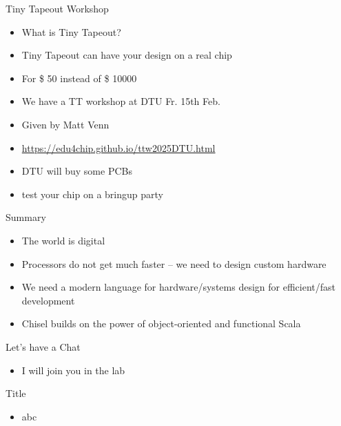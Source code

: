 \begin{frame}[fragile]{Tiny Tapeout Workshop}
\begin{itemize}
\item What is Tiny Tapeout?
\item Tiny Tapeout can have your design on a real chip
\item For \$ 50 instead of \$ 10000
\item We have a TT workshop at DTU Fr. 15th Feb.
\item Given by Matt Venn
\item \url{https://edu4chip.github.io/ttw2025DTU.html}
\item DTU will buy some PCBs
\item test your chip on a bringup party
\end{itemize}
\end{frame}

\begin{frame}[fragile]{Summary}
\begin{itemize}
\item The world is digital
\item Processors do not get much faster -- we need to design custom hardware
\item We need a modern language for hardware/systems design for efficient/fast development
\item Chisel builds on the power of object-oriented and functional Scala
\end{itemize}
\end{frame}

\begin{frame}[fragile]{Let's have a Chat}
\begin{itemize}
\item I will join you in the lab
\end{itemize}
\end{frame}



\begin{frame}[fragile]{Title}
\begin{itemize}
\item abc
\end{itemize}
\end{frame}
